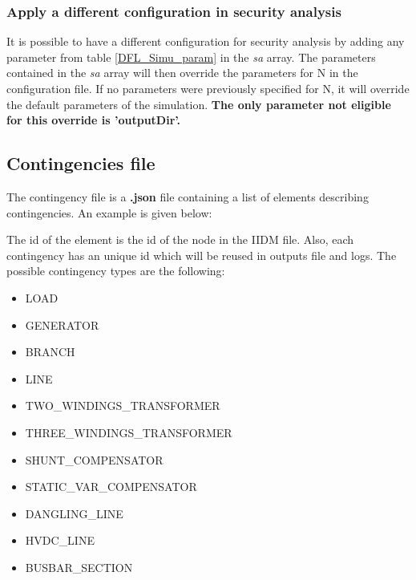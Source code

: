 \documentclass[a4paper, 12pt]{report}
\begin{document}
\subsubsection{Apply a different configuration in security analysis}

It is possible to have a different configuration for security analysis by adding any parameter from table \ref{DFL_Simu_param} in the \textit{sa} array.
The parameters contained in the \textit{sa} array will then override the parameters for N in the configuration file.
If no parameters were previously specified for N, it will override the default parameters of the simulation.
\textbf{The only parameter not eligible for this override is 'outputDir'.}




\subsection{Contingencies file}

The contingency file is a \textbf{.json} file containing a list of elements describing contingencies. An example is given below:


The id of the element is the id of the node in the IIDM file.
Also, each contingency has an unique id which will be reused in outputs file and logs.
The possible contingency types are the following:
\begin{itemize}
  \item LOAD
  \item GENERATOR
  \item BRANCH
  \item LINE
  \item TWO\_WINDINGS\_TRANSFORMER
  \item THREE\_WINDINGS\_TRANSFORMER
  \item SHUNT\_COMPENSATOR
  \item STATIC\_VAR\_COMPENSATOR
  \item DANGLING\_LINE
  \item HVDC\_LINE
  \item BUSBAR\_SECTION
\end{itemize}
\end{document}
